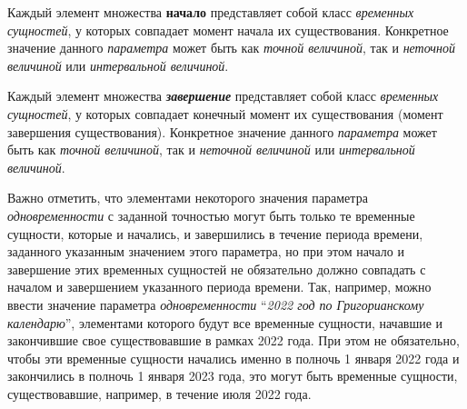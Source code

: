 Каждый элемент множества \textbf{начало} представляет собой класс \textit{временных сущностей}, у которых совпадает момент начала их существования. Конкретное значение данного \textit{параметра} может быть как \textit{точной величиной}, так и \textit{неточной величиной} или \textit{интервальной величиной}.


\begin{SCn}
\end{SCn}

Каждый элемент множества \textbf{\textit{завершение}} представляет собой класс \textit{временных сущностей}, у которых совпадает конечный момент их существования (момент завершения существования). Конкретное значение данного \textit{параметра} может быть как \textit{точной величиной}, так и \textit{неточной величиной} или \textit{интервальной величиной}.


\begin{SCn}
\end{SCn}

Важно отметить, что элементами некоторого значения параметра \textit{одновременности} с заданной точностью могут быть только те временные сущности, которые и начались, и завершились в течение периода времени, заданного указанным значением этого параметра, но при этом начало и завершение этих временных сущностей не обязательно должно совпадать с началом и завершением указанного периода времени. Так, например, можно ввести значение параметра \textit{одновременности} ``\textit{2022 год по Григорианскому календарю}'', элементами которого будут все временные сущности, начавшие и закончившие свое существовавшие в рамках 2022 года. При этом не обязательно, чтобы эти временные сущности начались именно в полночь 1 января 2022 года и закончились в полночь 1 января 2023 года, это могут быть временные сущности, существовавшие, например, в течение июля 2022 года.

